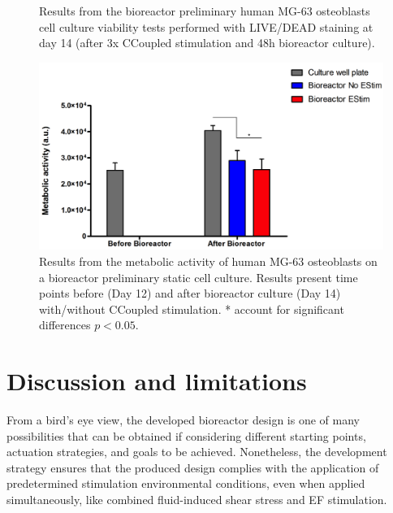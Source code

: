 \begin{figure}
\caption{Results from the bioreactor preliminary human MG-63 osteoblasts cell culture viability tests performed with LIVE/DEAD staining at day 14 (after 3x \acs{CCoupled} stimulation and 48h bioreactor culture).}
\label{figViability}
\end{figure}

\begin{figure}
\centering
\includegraphics[width=\textwidth]{./figures/Figure_6d11.png}
\caption{Results from the metabolic activity of human MG-63 osteoblasts on a bioreactor preliminary static cell culture. Results present time points before (Day 12) and after bioreactor culture (Day 14) with/without \acs{CCoupled} stimulation. * account for significant differences $p<0.05$.}
\label{figMetabolic}
\end{figure}




\section{Discussion and limitations}
From a bird's eye view, the developed bioreactor design is one of many possibilities that can be obtained if considering different starting points, actuation strategies, and goals to be achieved. Nonetheless, the development strategy ensures that the produced design complies with the application of predetermined stimulation environmental conditions, even when applied simultaneously, like combined fluid-induced shear stress and \acs{EF} stimulation. 

